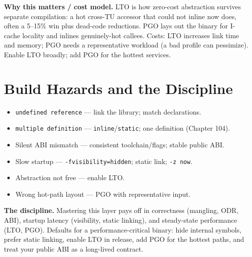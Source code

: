 \textbf{Why this matters / cost model.} LTO is how zero-cost abstraction survives separate compilation: a hot cross-TU accessor that could not inline now does, often a 5--15\% win plus dead-code reductions. PGO lays out the binary for I-cache locality and inlines genuinely-hot callees. Costs: LTO increases link time and memory; PGO needs a representative workload (a bad profile can pessimize). Enable LTO broadly; add PGO for the hottest services.

\section{Build Hazards and the Discipline}
\begin{itemize}
\item \texttt{undefined reference} --- link the library; match declarations.
\item \texttt{multiple definition} --- \texttt{inline}/\texttt{static}; one definition (Chapter 104).
\item Silent ABI mismatch --- consistent toolchain/flags; stable public ABI.
\item Slow startup --- \texttt{-fvisibility=hidden}; static link; \texttt{-z now}.
\item Abstraction not free --- enable LTO.
\item Wrong hot-path layout --- PGO with representative input.
\end{itemize}

\textbf{The discipline.} Mastering this layer pays off in correctness (mangling, ODR, ABI), startup latency (visibility, static linking), and steady-state performance (LTO, PGO). Defaults for a performance-critical binary: hide internal symbols, prefer static linking, enable LTO in release, add PGO for the hottest paths, and treat your public ABI as a long-lived contract.
